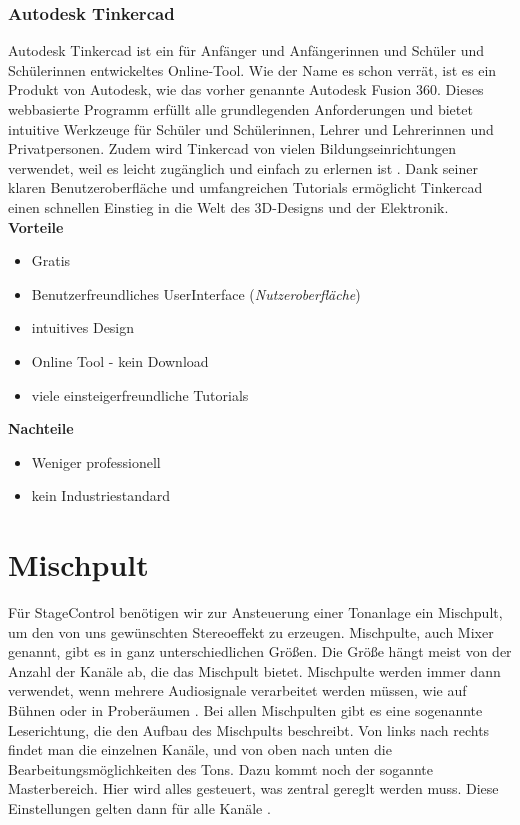 \subsubsection{Autodesk Tinkercad}
Autodesk Tinkercad ist ein für Anfänger und Anfängerinnen und Schüler und Schülerinnen entwickeltes Online-Tool. Wie der Name es schon verrät, ist es ein Produkt von Autodesk, wie das vorher genannte Autodesk Fusion 360. Dieses webbasierte Programm erfüllt alle grundlegenden Anforderungen und bietet intuitive Werkzeuge für Schüler und Schülerinnen, Lehrer und Lehrerinnen und Privatpersonen. Zudem wird Tinkercad von vielen Bildungseinrichtungen verwendet, weil es leicht zugänglich und einfach zu erlernen ist \textcite{Tinkercad}. Dank seiner klaren Benutzeroberfläche und umfangreichen Tutorials ermöglicht Tinkercad einen schnellen Einstieg in die Welt des 3D-Designs und der Elektronik. \\


\textbf{Vorteile}
\begin{itemize}
	\item Gratis
	\item Benutzerfreundliches UserInterface (\emph{Nutzeroberfläche})
	\item intuitives Design
	\item Online Tool - kein Download 	
	\item viele einsteigerfreundliche Tutorials \textcite{TinkercadReviews}
\end{itemize}

\textbf{Nachteile}
\begin{itemize}
	\item Weniger professionell
	\item kein Industriestandard \textcite{TinkercadReviews}
\end{itemize}

\section{Mischpult}
 Für StageControl benötigen wir zur Ansteuerung einer Tonanlage ein Mischpult, um den von uns gewünschten Stereoeffekt zu erzeugen. Mischpulte, auch Mixer genannt, gibt es in ganz unterschiedlichen Größen. Die Größe hängt meist von der Anzahl der Kanäle ab, die das Mischpult bietet. Mischpulte werden immer dann verwendet, wenn mehrere Audiosignale verarbeitet werden müssen, wie auf Bühnen oder in Proberäumen \textcite{MischpultInformation}. Bei allen Mischpulten gibt es eine sogenannte Leserichtung, die den Aufbau des Mischpults beschreibt. Von links nach rechts findet man die einzelnen Kanäle, und von oben nach unten die Bearbeitungsmöglichkeiten des Tons. Dazu kommt noch der sogannte Masterbereich. Hier wird alles gesteuert, was zentral gereglt werden muss. Diese Einstellungen gelten dann für alle Kanäle  \textcite{MischpultMaster}. \\
 

